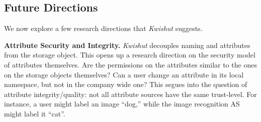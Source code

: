 


\subsection{Future Directions}
\label{hotstorage:future}
We now explore a few research directions that \emph{Kwishut} suggests.

\noindent\textbf{Attribute Security and Integrity.}
\emph{Kwishut} decouples naming and attributes from the storage object. This opens up a
research direction on the security model of attributes themselves. Are the
permissions on the attributes similar to the ones on the storage objects
themselves? Can a user change an attribute in its local namespace, but not in
the company wide one? This segues into the question of attribute
integrity/quality: not all attribute sources have the same trust-level. For
instance, a user might label an image ``dog,'' while the image recognition AS
might label it ``cat''.

